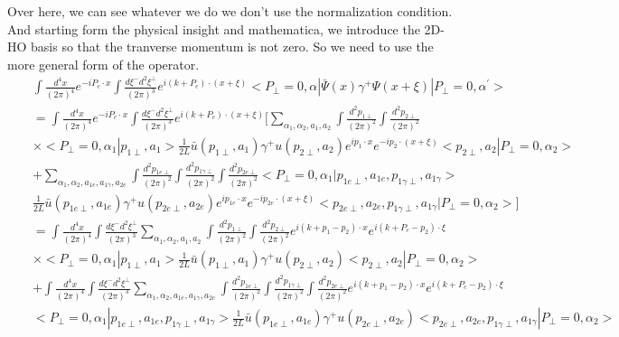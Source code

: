 \documentclass[a4paper,12pt]{article}
\begin{document}
Over here, we can see whatever we do we don't use the normalization condition. And starting form the physical insight and mathematica, we introduce the 2D-HO basis so that  the tranverse momentum is not zero. So we need to use the more general form of the operator.
\begin{eqnarray}
  &&\int \frac{d^4x}{(2\pi)^4} e^{-iP_c \cdot x} \int \frac{d\xi^- d^2 \xi^{\perp}}{(2\pi)^3} e^{i(k+P_c)\cdot(x+\xi)} <P_{\perp}=0,\alpha| \bar{\Psi}(x) \gamma^+ \Psi(x+\xi) |P_{\perp}=0, \alpha^{\prime}>\nonumber\\
  &&=\int \frac{d^4x}{(2\pi)^4} e^{-iP_c \cdot x} \int \frac{d\xi^- d^2 \xi^{\perp}}{(2\pi)^3} e^{i(k+P_c)\cdot(x+\xi)}[\sum_{\alpha_1,\alpha_2,a_1,a_2}\int \frac{d^2 p_{1\perp}}{(2\pi)^2} \int \frac{d^2 p_{2\perp}}{(2\pi)^2}\nonumber\\&& \times <P_{\perp}=0,\alpha_1|p_{1\perp},a_1>\frac{1}{2L}\bar{u} (p_{1\perp},a_1) \gamma^+ u(p_{2\perp},a_2) e^{ip_1 \cdot x} e^{-ip_2 \cdot (x+\xi)}<p_{2\perp},a_2|P_{\perp}=0,\alpha_2>\nonumber\\
  &&+\sum_{\alpha_1,\alpha_2,a_{1e},a_{1\gamma},a_{2e}} \int \frac{d^2 p_{1e\perp}}{(2\pi)^2}\int \frac{d^2 p_{1\gamma\perp}}{(2\pi)^2}\int \frac{d^2 p_{2e\perp}}{(2\pi)^2} <P_{\perp}=0,\alpha_1|p_{1e\perp},a_{1e},p_{1\gamma\perp},a_{1\gamma}>\nonumber\\&&\frac{1}{2L}\bar{u}(p_{1e\perp},a_{1e}) \gamma^+ u(p_{2e\perp},a_{2e}) e^{ip_{1e} \cdot x} e^{-ip_{2e} \cdot (x+\xi)}<p_{2e\perp},a_{2e},p_{1\gamma\perp},a_{1\gamma}|P_{\perp}=0,\alpha_2>]\nonumber\\
  &&= \int \frac{d^4x}{(2\pi)^4} \int\frac{d\xi^- d^2 \xi^{\perp}}{(2\pi)^3} \sum_{\alpha_1,\alpha_2,a_1,a_2}\int \frac{d^2 p_{1\perp}}{(2\pi)^2} \int \frac{d^2 p_{2\perp}}{(2\pi)^2} e^{i(k+p_1-p_2)\cdot x} e^{i(k+P_c-p_2)\cdot \xi} \nonumber\\&& \times <P_{\perp}=0,\alpha_1|p_{1\perp},a_1>\frac{1}{2L}\bar{u} (p_{1\perp},a_1) \gamma^+ u(p_{2\perp},a_2)<p_{2\perp},a_2|P_{\perp}=0,\alpha_2>\nonumber\\
  &&+\int \frac{d^4x}{(2\pi)^4} \int\frac{d\xi^- d^2 \xi^{\perp}}{(2\pi)^3}\sum_{\alpha_1,\alpha_2,a_{1e},a_{1\gamma},a_{2e}} \int \frac{d^2 p_{1e\perp}}{(2\pi)^2}\int \frac{d^2 p_{1\gamma\perp}}{(2\pi)^2}\int \frac{d^2 p_{2e\perp}}{(2\pi)^2}e^{i(k+p_1-p_2)\cdot x} e^{i(k+P_c-p_2)\cdot \xi}\nonumber\\&&<P_{\perp}=0,\alpha_1|p_{1e\perp},a_{1e},p_{1\gamma\perp},a_{1\gamma}>\frac{1}{2L}\bar{u}(p_{1e\perp},a_{1e}) \gamma^+ u(p_{2e\perp},a_{2e})<p_{2e\perp},a_{2e},p_{1\gamma\perp},a_{1\gamma}|P_{\perp}=0,\alpha_2>\nonumber\
\end{eqnarray}
\end{document}
